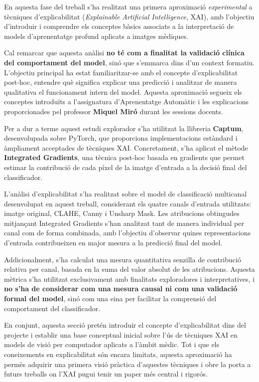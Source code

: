 \documentclass[conference]{IEEEtran}
\begin{document}
En aquesta fase del treball s’ha realitzat una primera aproximació
\textit{experimental} a tècniques d’explicabilitat (\textit{Explainable Artificial Intelligence}, XAI),
amb l’objectiu d’introduir i comprendre els conceptes bàsics associats a la
interpretació de models d’aprenentatge profund aplicats a imatges mèdiques.

Cal remarcar que aquesta anàlisi \textbf{no té com a finalitat la validació clínica
del comportament del model}, sinó que s’emmarca dins d’un context formatiu.
L’objectiu principal ha estat familiaritzar-se amb el concepte d’explicabilitat
post-hoc, entendre què significa explicar una predicció i analitzar de manera
qualitativa el funcionament intern del model. Aquesta aproximació segueix els
conceptes introduïts a l’assignatura d’Aprenentatge Automàtic i les explicacions
proporcionades pel professor \textbf{Miquel Miró} durant les sessions docents.

Per a dur a terme aquest estudi explorador s’ha utilitzat la llibreria
\textbf{Captum}, desenvolupada sobre PyTorch, que proporciona implementacions
estàndard i àmpliament acceptades de tècniques XAI. Concretament, s’ha aplicat el
mètode \textbf{Integrated Gradients}, una tècnica post-hoc basada en gradients que
permet estimar la contribució de cada píxel de la imatge d’entrada a la decisió
final del classificador.

L’anàlisi d’explicabilitat s’ha realitzat sobre el model de classificació
multicanal desenvolupat en aquest treball, considerant els quatre canals
d’entrada utilitzats: imatge original, CLAHE, Canny i Unsharp Mask. Les
atribucions obtingudes mitjançant Integrated Gradients s’han analitzat tant de
manera individual per canal com de forma combinada, amb l’objectiu d’observar
quines representacions d’entrada contribueixen en major mesura a la predicció
final del model.

Addicionalment, s’ha calculat una mesura quantitativa senzilla de contribució
relativa per canal, basada en la suma del valor absolut de les atribucions.
Aquesta mètrica s’ha utilitzat exclusivament amb finalitats exploradores i
interpretatives, i \textbf{no s’ha de considerar com una mesura causal ni com una
validació formal del model}, sinó com una eina per facilitar la comprensió del
comportament del classificador.

En conjunt, aquesta secció pretén introduir el concepte d’explicabilitat dins del
projecte i establir una base conceptual inicial sobre l’ús de tècniques XAI en
models de visió per computador aplicats a l’àmbit mèdic. Tot i que els
coneixements en explicabilitat són encara limitats, aquesta aproximació ha
permès adquirir una primera visió pràctica d’aquestes tècniques i obre la porta
a futurs treballs on l’XAI pugui tenir un paper més central i rigorós.
\end{document}
